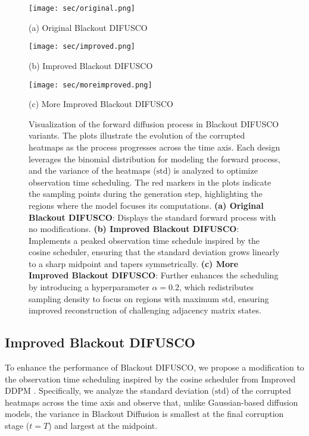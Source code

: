 \begin{figure*}[ht]
    \centering
    \begin{minipage}{0.32\textwidth}
        \centering
        \texttt{[image: sec/original.png]}
        \caption*{(a) Original Blackout DIFUSCO}
    \end{minipage}
    \begin{minipage}{0.32\textwidth}
        \centering
        \texttt{[image: sec/improved.png]}
        \caption*{(b) Improved Blackout DIFUSCO}
    \end{minipage}
    \begin{minipage}{0.32\textwidth}
        \centering
        \texttt{[image: sec/moreimproved.png]}
        \caption*{(c) More Improved Blackout DIFUSCO}
    \end{minipage}
    \caption{
        Visualization of the forward diffusion process in Blackout DIFUSCO variants. 
        The plots illustrate the evolution of the corrupted heatmaps as the process progresses across the time axis. 
        Each design leverages the binomial distribution for modeling the forward process, and the variance of the heatmaps (\(\text{std}\)) is analyzed to optimize observation time scheduling. The red markers in the plots indicate the sampling points during the generation step, highlighting the regions where the model focuses its computations.
        \textbf{(a) Original Blackout DIFUSCO}: Displays the standard forward process with no modifications.
        \textbf{(b) Improved Blackout DIFUSCO}: Implements a peaked observation time schedule inspired by the cosine scheduler, ensuring that the standard deviation grows linearly to a sharp midpoint and tapers symmetrically.
        \textbf{(c) More Improved Blackout DIFUSCO}: Further enhances the scheduling by introducing a hyperparameter \(\alpha = 0.2\), which redistributes sampling density to focus on regions with maximum \(\text{std}\), ensuring improved reconstruction of challenging adjacency matrix states.
    }
    \label{fig:blackout_difusco_comparison}
\end{figure*}


\subsection{Improved Blackout DIFUSCO}
To enhance the performance of Blackout DIFUSCO, we propose a modification to the observation time scheduling inspired by the cosine scheduler from Improved DDPM \cite{nichol2021improved}. Specifically, we analyze the standard deviation (\(\text{std}\)) of the corrupted heatmaps across the time axis and observe that, unlike Gaussian-based diffusion models, the variance in Blackout Diffusion is smallest at the final corruption stage (\(t = T\)) and largest at the midpoint. 

